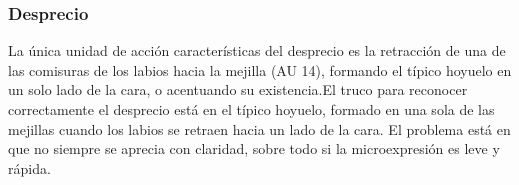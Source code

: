 \subsubsection*{Desprecio}
La única unidad de acción características del desprecio es la retracción de una de las comisuras de los labios hacia la mejilla (AU 14), formando el típico hoyuelo en un solo lado de la cara, o acentuando su existencia.El truco para reconocer correctamente el desprecio está en el típico hoyuelo, formado en una sola de las mejillas cuando los labios se retraen hacia un lado de la cara. El problema está en que no siempre se aprecia con claridad, sobre todo si la microexpresión es leve y rápida.
